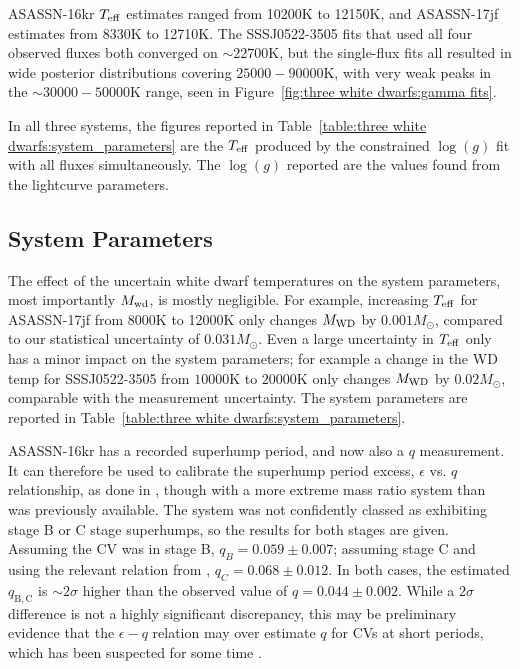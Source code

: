 ASASSN-16kr $T_{\rm eff}$ estimates ranged from 10200K to 12150K, and ASASSN-17jf estimates from 8330K to  12710K.
The SSSJ0522-3505 fits that used all four observed fluxes both converged on $\sim22700$K, but the single-flux fits all resulted in wide posterior distributions covering $25000 - 90000$K, with very weak peaks in the $\sim30000 - 50000$K range, seen in Figure~\ref{fig:three white dwarfs:gamma fits}.

In all three systems, the figures reported in Table~\ref{table:three white dwarfs:system_parameters} are the $T_{\rm eff}$ produced by the constrained $\log (g)$ fit with all fluxes simultaneously.
The $\log (g)$ reported are the values found from the lightcurve parameters.


\subsection{System Parameters}
\label{sect:system parameters}

The effect of the uncertain white dwarf temperatures on the system parameters, most importantly $M_{\rm wd}$, is mostly negligible. For example, increasing $T_{\rm eff}$ for ASASSN-17jf from 8000K to 12000K only changes $M_{\rm WD}$ by $0.001M_\odot$, compared to our statistical uncertainty of $0.031 M_\odot$. Even a large uncertainty in $T_{\rm eff}$ only has a minor impact on the system parameters; for example a change in the WD temp for SSSJ0522-3505 from $10000$K to $20000$K only changes $M_{\rm WD}$ by $0.02 M_\odot$, comparable with the measurement uncertainty. The system parameters are reported in Table~\ref{table:three white dwarfs:system_parameters}.

ASASSN-16kr has a recorded superhump period, and now also a $q$ measurement. It can therefore be used to calibrate the superhump period excess, $\epsilon$ vs. $q$ relationship, as done in \citet{McAllister2019}, though with a more extreme mass ratio system than was previously available. The system was not confidently classed as exhibiting stage B or C stage superhumps, so the results for both stages are given. Assuming the CV was in stage B, $q_B = 0.059\pm0.007$; assuming stage C and using the relevant relation from \citet{McAllister2019}, $q_C = 0.068\pm0.012$. In both cases, the estimated $q_\mathrm{B,C}$ is $\sim 2 \sigma$ higher than the observed value of $q = 0.044\pm0.002$. While a $2 \sigma$ difference is not a highly significant discrepancy, this may be preliminary evidence that the $\epsilon - q$ relation may over estimate $q$ for CVs at short periods, which has been suspected for some time \citep{pearson2007, knigge11}.

